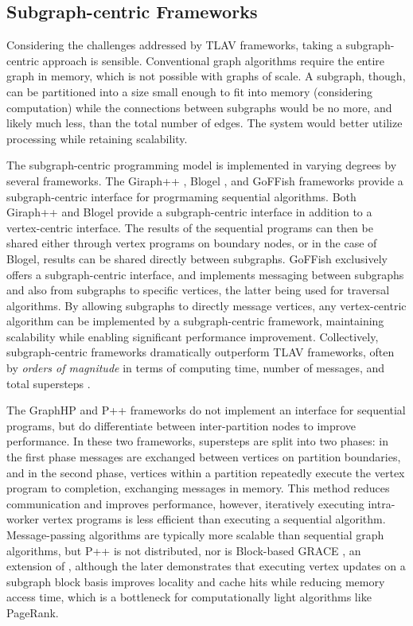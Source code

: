 \documentclass[reprint,twocolumn,showpacs,preprintnumbers,amsmath, aps,pre,amssymb]{revtex4-1}
\begin{document}
\subsection{Subgraph-centric Frameworks}

Considering the challenges addressed by TLAV frameworks, taking a subgraph-centric approach is sensible.  Conventional graph algorithms require the entire graph in memory, which is not possible with graphs of scale.  A subgraph, though, can be partitioned into a size small enough to fit into memory (considering computation) while the connections between subgraphs would be no more, and likely much less, than the total number of edges.  The system would better utilize processing while retaining scalability.

The subgraph-centric programming model is implemented in varying degrees by several frameworks.  The Giraph++ \cite{Tian2013}, Blogel \cite{Yan2014}, and GoFFish \cite{Simmhan2013} frameworks provide a subgraph-centric interface for progrmaming sequential algorithms.  Both Giraph++ and Blogel provide a subgraph-centric interface in addition to a vertex-centric interface.  The results of the sequential programs can then be shared either through vertex programs on boundary nodes, or in the case of Blogel, results can be shared directly between subgraphs.  GoFFish exclusively offers a subgraph-centric interface, and implements messaging between subgraphs and also from subgraphs to specific vertices, the latter being used for traversal algorithms.  By allowing subgraphs to directly message vertices, any vertex-centric algorithm can be implemented by a subgraph-centric framework, maintaining scalability while enabling significant performance improvement.  Collectively, subgraph-centric frameworks dramatically outperform TLAV frameworks, often by {\em orders of magnitude} in terms of computing time, number of messages, and total supersteps \cite{Tian2013,Yan2014}.  

The GraphHP \cite{Chen} and  P++ \cite{Zhou2014} frameworks do not implement an interface for sequential programs, but do differentiate between inter-partition nodes to improve performance.  In these two frameworks, supersteps are split into two phases: in the first phase messages are exchanged between vertices on partition boundaries, and in the second phase, vertices within a partition repeatedly execute the vertex program to completion, exchanging messages in memory.  This method reduces communication and improves performance, however, iteratively executing intra-worker vertex programs is less efficient than executing a sequential algorithm. Message-passing algorithms are typically more scalable than sequential graph algorithms, but P++ is not distributed, nor is Block-based GRACE \cite{Xie2013a}, an extension of \cite{Wang2013}, although the later demonstrates that executing vertex updates on a subgraph block basis improves locality and cache hits while reducing memory access time, which is a bottleneck for computationally light algorithms like PageRank.
\end{document}
